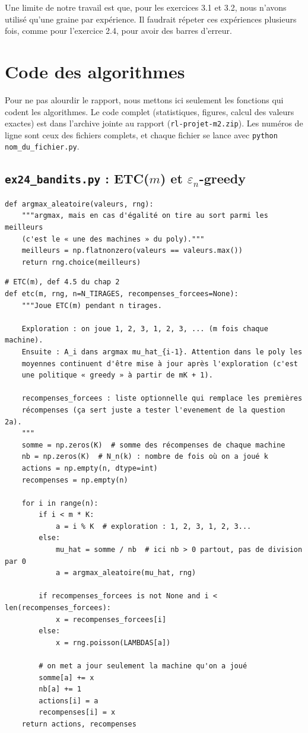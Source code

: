 \documentclass[11pt,a4paper]{article}
\begin{document}
Une limite de notre travail est que, pour les exercices 3.1 et 3.2, nous n'avons utilisé qu'une graine par expérience. Il faudrait répeter ces expériences plusieurs fois, comme pour l'exercice 2.4, pour avoir des barres d'erreur.

\clearpage
\appendix
\section{Code des algorithmes}

Pour ne pas alourdir le rapport, nous mettons ici seulement les fonctions qui codent les algorithmes. Le code complet (statistiques, figures, calcul des valeurs exactes) est dans l'archive jointe au rapport (\texttt{rl-projet-m2.zip}). Les numéros de ligne sont ceux des fichiers complets, et chaque fichier se lance avec \texttt{python nom\_du\_fichier.py}.

\subsection{\texttt{ex24\_bandits.py} : ETC($m$) et $\varepsilon_n$-greedy}

\begin{lstlisting}[firstnumber=35]
def argmax_aleatoire(valeurs, rng):
    """argmax, mais en cas d'égalité on tire au sort parmi les meilleurs
    (c'est le « une des machines » du poly)."""
    meilleurs = np.flatnonzero(valeurs == valeurs.max())
    return rng.choice(meilleurs)
\end{lstlisting}

\begin{lstlisting}[firstnumber=42]
# ETC(m), def 4.5 du chap 2
def etc(m, rng, n=N_TIRAGES, recompenses_forcees=None):
    """Joue ETC(m) pendant n tirages.

    Exploration : on joue 1, 2, 3, 1, 2, 3, ... (m fois chaque machine).
    Ensuite : A_i dans argmax mu_hat_{i-1}. Attention dans le poly les
    moyennes continuent d'être mise à jour après l'exploration (c'est
    une politique « greedy » à partir de mK + 1).

    recompenses_forcees : liste optionnelle qui remplace les premières
    récompenses (ça sert juste a tester l'evenement de la question 2a).
    """
    somme = np.zeros(K)  # somme des récompenses de chaque machine
    nb = np.zeros(K)  # N_n(k) : nombre de fois où on a joué k
    actions = np.empty(n, dtype=int)
    recompenses = np.empty(n)

    for i in range(n):
        if i < m * K:
            a = i % K  # exploration : 1, 2, 3, 1, 2, 3...
        else:
            mu_hat = somme / nb  # ici nb > 0 partout, pas de division par 0
            a = argmax_aleatoire(mu_hat, rng)

        if recompenses_forcees is not None and i < len(recompenses_forcees):
            x = recompenses_forcees[i]
        else:
            x = rng.poisson(LAMBDAS[a])

        # on met a jour seulement la machine qu'on a joué
        somme[a] += x
        nb[a] += 1
        actions[i] = a
        recompenses[i] = x
    return actions, recompenses
\end{lstlisting}
\end{document}
